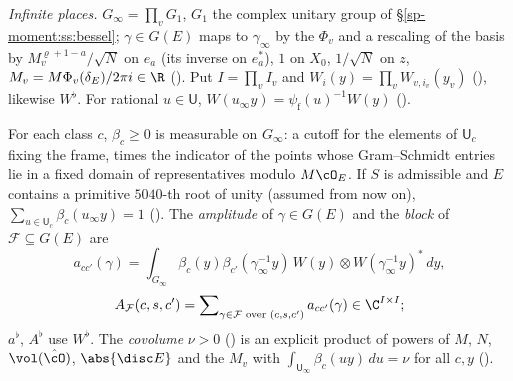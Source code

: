 \emph{Infinite places.} $G_\infty=\prod_vG_1$, $G_1$ the complex unitary group of
\S\ref{sp-moment:ss:bessel}; $\gamma\in G(E)$ maps to $\gamma_\infty$ by the $\Phi_v$ and a
rescaling of the basis by $M_v^{\varrho+1-a}/\sqrt N$ on $e_a$ (its inverse on $e_a^*$), $1$ on $X_0$, $1/\sqrt N$ on $z$,
$M_v=M\Phi_v(\delta_E)/2\pi i\in\R$ (). Put $I=\prod_vI_v$ and
$W_i(y)=\prod_vW_{v,i_v}(y_v)$ (), likewise $W^\flat$. For rational
$u\in\mathsf U$, $W(u_\infty y)=\psi_{\mathrm f}(u)^{-1}W(y)$ ().

\begin{definition}\label{sp-unfold:def:amp}
For each class $c$, $\beta_c\ge0$ is measurable on $G_\infty$: a cutoff for the elements of
$\mathsf U_c$ fixing the frame, times the indicator of the points whose Gram--Schmidt entries lie in
a fixed domain of representatives modulo $M\cO_E$. If $S$ is admissible and $E$ contains a
primitive $5040$-th root of unity (assumed from now on), $\sum_{u\in\mathsf U_c}\beta_c(u_\infty
y)=1$ (). The \emph{amplitude} of $\gamma\in G(E)$ and the \emph{block} of $\mathcal F\subseteq G(E)$ are
\[
a_{cc'}(\gamma)=\int_{G_\infty}\beta_c(y)\beta_{c'}(\gamma_\infty^{-1}y)\,
W(y)\otimes W(\gamma_\infty^{-1}y)^*\,dy,
\]
\[
A_{\mathcal F}(c,s,c')=\sum\nolimits_{\gamma\in\mathcal F\text{ over }(c,s,c')}a_{cc'}(\gamma)\in\C^{I\times I};
\]
$a^\flat$, $A^\flat$ use $W^\flat$. The \emph{covolume} $\nu>0$
() is an explicit product of powers of $M$, $N$,
$\vol(\hat\cO)$, $\abs{\disc E}$ and the $M_v$ with $\int_{\mathsf U_\infty}\beta_c(uy)\,du=\nu$
for all $c,y$ ().
\end{definition}

